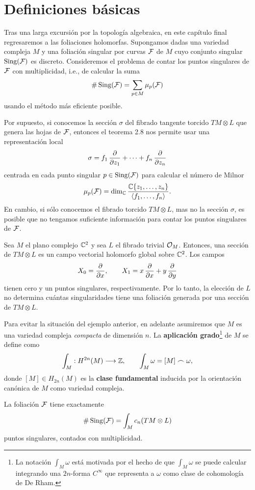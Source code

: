 \section{Definiciones básicas}

Tras una larga excursión por la topología algebraica, en este capítulo final regresaremos a las foliaciones holomorfas. Supongamos dadas una variedad compleja $M$ y una foliación singular por curvas $\mathcal F$ de $M$ cuyo conjunto singular $\operatorname{Sing}(\mathcal F)$ es discreto. Consideremos el problema de contar los puntos singulares de $\mathcal F$ con multiplicidad, i.e., de calcular la suma
$$\# \operatorname{Sing}(\mathcal F) = \sum_{p \in M} \mu_p(\mathcal F)$$
usando el método más eficiente posible.

Por supuesto, si conocemos la sección $\sigma$ del fibrado tangente torcido $TM \otimes L$ que genera las hojas de $\mathcal F$, entonces el teorema 2.8 nos permite usar una representación local
$$\sigma = f_1 \, \dfrac \partial {\partial z_1} + \dots + f_n \, \dfrac \partial {\partial z_n}$$
centrada en cada punto singular $p \in \operatorname{Sing}(\mathcal F)$ para calcular el número de Milnor
$$\mu_p(\mathcal F) = \dim_\mathbb C \dfrac {\mathbb C \{ z_1, \dots, z_n \}} {\langle f_1, \dots, f_n \rangle}.$$
En cambio, si sólo conocemos el fibrado torcido $TM \otimes L$, mas no la sección $\sigma$, es posible que no tengamos suficiente información para contar los puntos singulares de $\mathcal F$.

\begin{example}
Sea $M$ el plano complejo $\mathbb C^2$ y sea $L$ el fibrado trivial $\mathcal O_M$. Entonces, una sección de $TM \otimes L$ es un campo vectorial holomorfo global sobre $\mathbb C^2$. Los campos
$$X_0 = \dfrac \partial {\partial x}, \qquad X_1 = x \, \dfrac \partial {\partial x} + y \, \dfrac \partial {\partial y}$$
tienen cero y un puntos singulares, respectivamente. Por lo tanto, la elección de $L$ no determina cuántas singularidades tiene una foliación generada por una sección de $TM \otimes L$.
\end{example}

Para evitar la situación del ejemplo anterior, en adelante asumiremos que $M$ es una variedad compleja \textit{compacta} de dimensión $n$. La \textbf{aplicación grado}\footnote{La notación $\int_M \omega$ está motivada por el hecho de que $\int_M \omega$ se puede calcular integrando una $2n$-forma $C^\infty$ que representa a $\omega$ como clase de cohomología de De Rham.} de $M$ se define como
$$\int_M : H^{2n}(M) \longrightarrow \mathbb Z, \qquad \int_M \omega = [M] \frown \omega,$$
donde $[M] \in H_{2n}(M)$ es la \textbf{clase fundamental} inducida por la orientación canónica de $M$ como variedad compleja.

\begin{proposition}
La foliación $\mathcal F$ tiene exactamente
$$\# \operatorname{Sing}(\mathcal F) = \int_M c_n(TM \otimes L)$$
puntos singulares, contados con multiplicidad.
\end{proposition}

